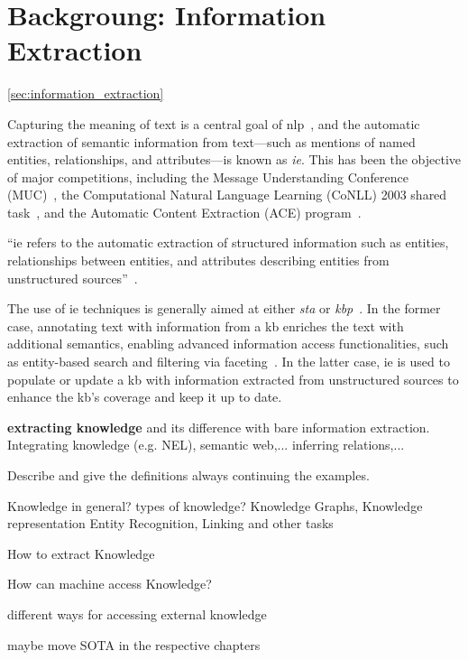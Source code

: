\section{Backgroung: Information Extraction}
\ref{sec:information_extraction}

Capturing the meaning of text is a central goal of \acl{nlp}~\cite{entityorientedsearch2018balog}, and the automatic extraction of semantic information from text---such as mentions of named entities, relationships, and attributes---is known as \emph{\acl{ie}}. This has been the objective of major competitions, including the Message Understanding Conference (MUC)~\cite{muc_lessons_1998,muc6_overview_1995,muc7_overview_1998}, the Computational Natural Language Learning (CoNLL) 2003 shared task~\cite{conll2003}, and the Automatic Content Extraction (ACE) program~\cite{ace_2004}.

\begin{definition}
``\Acf{ie} refers to the automatic extraction of structured information such as entities, relationships between entities, and attributes describing entities from unstructured sources''~\cite{infoextraction2008}.
\end{definition}
The use of \ac{ie} techniques is generally aimed at either \emph{\acl{sta}} or \emph{\acl{kbp}}~\cite{entityorientedsearch2018balog}.
In the former case, annotating text with information from a \ac{kb} enriches the text with additional semantics, enabling advanced information access functionalities, such as entity-based search and filtering via faceting~\cite{entityorientedsearch2018balog}.
In the latter case, \ac{ie} is used to populate or update a \ac{kb} with information extracted from unstructured sources to enhance the \ac{kb}'s coverage and keep it up to date.




\textbf{extracting knowledge} and its difference with bare information extraction. Integrating knowledge (e.g. NEL), semantic web,... inferring relations,...

Describe and give the definitions always continuing the examples.

Knowledge in general? types of knowledge? Knowledge Graphs, Knowledge representation
Entity Recognition, Linking and other tasks

How to extract Knowledge

How can machine access Knowledge?

different ways for accessing external knowledge

maybe move SOTA in the respective chapters
